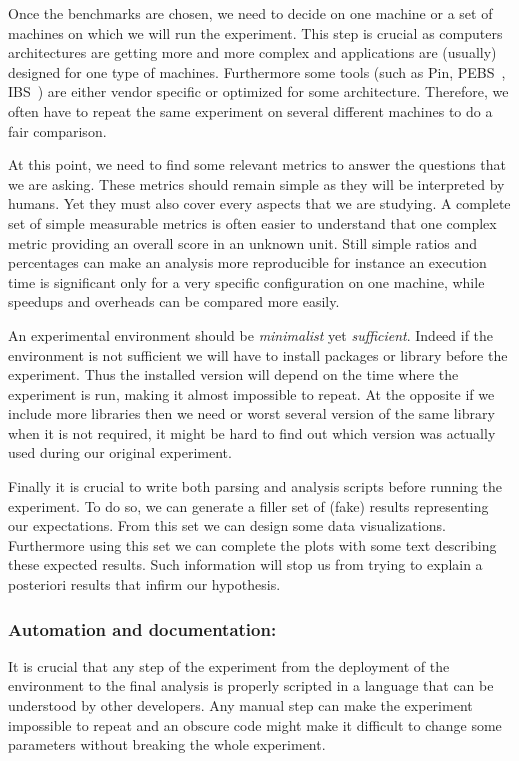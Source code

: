 Once the benchmarks are chosen, we need to decide on one machine or a set of machines on which we will run the experiment.
This step is crucial as computers architectures are getting more and more complex  and applications are (usually) designed for one type of machines.
Furthermore some tools (such as \gls{Pin}, \gls{PEBS}~\cite{Levinthal09Performance}, \gls{IBS}~\cite{Drongowski07Instructionbased}) are either vendor specific or optimized for some architecture.
Therefore, we often have to repeat the same experiment on several different machines to do a fair comparison.

At this point, we need to find some relevant metrics to answer the questions that we are asking.
These metrics should remain simple as they will be interpreted by humans.
Yet they must also cover every aspects that we are studying.
A complete set of simple measurable metrics is often easier to understand that one complex metric providing an overall score in an unknown unit.
Still simple ratios and percentages can make an analysis more reproducible for instance an execution time is significant only for a very specific configuration on one machine, while speedups and overheads can be compared more easily.

An experimental environment should be \emph{minimalist} yet \emph{sufficient}.
Indeed if the environment is not sufficient we will have to install packages or library before the experiment.
Thus the installed version will depend on the time where the experiment is run, making it almost impossible to repeat.
At the opposite if we include more libraries then we need or worst several version of the same library when it is not required, it might be hard to find out which version was actually used during our original experiment.

Finally it is crucial to write both parsing and analysis scripts before running the experiment.
To do so, we can generate a filler set of (fake) results representing our expectations.
From this set we can design some data visualizations.
Furthermore using this set we can complete the plots with some text describing these expected results.
Such information will stop us from trying to explain a posteriori results that infirm our hypothesis.

\subsubsection{Automation and documentation:}

It is crucial that any step of the experiment from the deployment of the environment to the final analysis is properly scripted in a language that can be understood by other developers.
Any manual step can make the experiment impossible to repeat and an obscure code might make it difficult to change some parameters without breaking the whole experiment.

